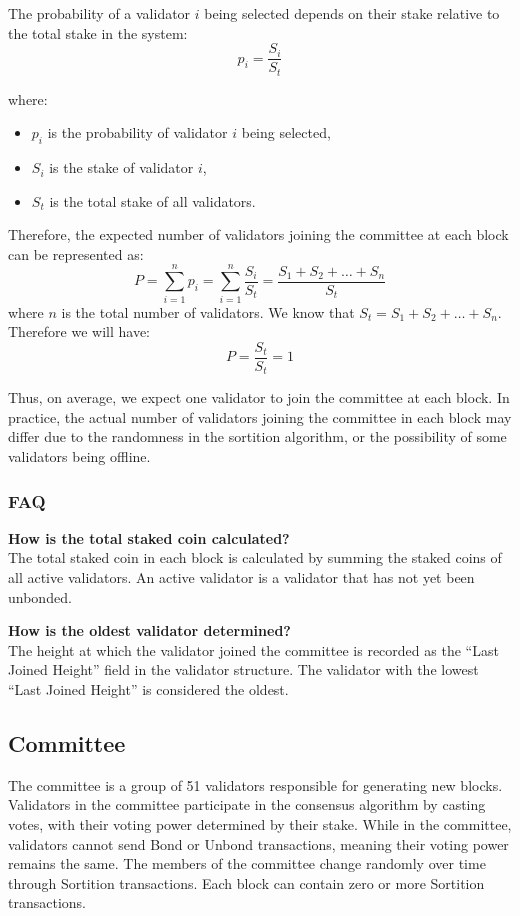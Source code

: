 \documentclass{novel}
\begin{document}
The probability of a validator $i$ being selected depends on their stake relative to the total stake in the system:
\begin{equation*}
  p_i=\frac{S_i}{S_t}
\end{equation*}

where:
\begin{itemize}
  \item $p_i$ is the probability of validator $i$ being selected,
  \item $S_i$ is the stake of validator $i$,
  \item $S_t$ is the total stake of all validators.
\end{itemize}

Therefore, the expected number of validators joining the committee at each block can be represented as:
\begin{equation*}
  P=\sum_{i=1}^{n}{p_i}=\sum_{i=1}^{n}{\frac{S_i}{S_t}}=\frac{S_1+S_2+\ldots+S_n}{S_t}
\end{equation*}
where $n$ is the total number of validators. We know that $S_t={S_1+S_2+\ldots+S_n}$. Therefore we will have:
\begin{equation*}
  P=\frac{S_t}{S_t}=1
\end{equation*}

Thus, on average, we expect one validator to join the committee at each block. In practice, the actual number of validators joining the committee in each block may differ due to the randomness in the sortition algorithm, or the possibility of some validators being offline.

\subsubsection{FAQ}
\noindent \textbf{How is the total staked coin calculated?}\\
The total staked coin in each block is calculated by summing the staked coins of all active validators. An active validator is a validator that has not yet been unbonded.

\noindent \textbf{How is the oldest validator determined?}\\
The height at which the validator joined the committee is recorded as the “Last Joined Height” field in the validator structure. The validator with the lowest “Last Joined Height” is considered the oldest.



\subsection{Committee}
The committee is a group of 51 validators responsible for generating new blocks. Validators in the committee participate in the consensus algorithm by casting votes, with their voting power determined by their stake. While in the committee, validators cannot send Bond or Unbond transactions, meaning their voting power remains the same. The members of the committee change randomly over time through Sortition transactions. Each block can contain zero or more Sortition transactions.
\end{document}
